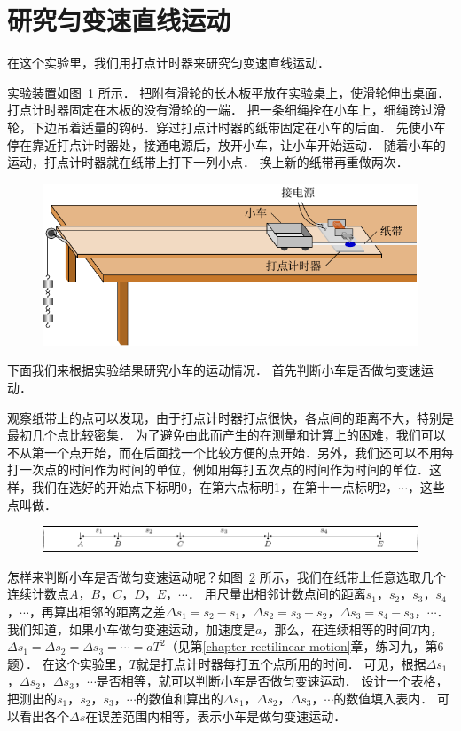 \section{研究匀变速直线运动}\label{sec-A-app-1-7-study of-uniformly-variable-linear-motion}
在这个实验里，我们用打点计时器来研究匀变速直线运动．

实验装置如图~\ref{fig_A_10-9} 所示．
把附有滑轮的长木板平放在实验桌上，使滑轮伸出桌面．打点计时器固定在木板的没有滑轮的一端．
把一条细绳拴在小车上，细绳跨过滑轮，下边吊着适量的钩码．穿过打点计时器的纸带固定在小车的后面．
先使小车停在靠近打点计时器处，接通电源后，放开小车，让小车开始运动．
随着小车的运动，打点计时器就在纸带上打下一列小点．
换上新的纸带再重做两次．	
\begin{figure}[htbp]
    \centering
    \includegraphics{fig/A/10-9.pdf}
    \caption{}\label{fig_A_10-9}
\end{figure}

下面我们来根据实验结果研究小车的运动情况．
首先判断小车是否做匀变速运动．

观察纸带上的点可以发现，由于打点计时器打点很快，各点间的距离不大，特别是最初几个点比较密集．
为了避免由此而产生的在测量和计算上的困难，我们可以不从第一个点开始，而在后面找一个比较方便的点开始．另外，我们还可以不用每打一次点的时间作为时间的单位，例如用每打五次点的时间作为时间的单位．这样，我们在选好的开始点下标明0，在第六点标明1，在第十一点标明2，$\cdots$，这些点叫做．

\begin{figure}[htbp]
    \centering
    \includegraphics{fig/A/10-10.pdf}
    \caption{}\label{fig_A_10-10}
\end{figure}
    

怎样来判断小车是否做匀变速运动呢？如图~\ref{fig_A_10-10} 所示，我们在纸带上任意选取几个连续计数点$A $，$ B $，$ C $，$ D $，$ E $，$ \cdots$．
用尺量出相邻计数点间的距离$s_1 $，$ s_2 $，$ s_3 $，$ s_4 $，$ \cdots$，再算出相邻的距离之差$\Delta s_1=s_2-s_1 $，$ \Delta s_2=s_3-s_2 $，$ \Delta s_3=s_4-s_3 $，$ \cdots$．
我们知道，如果小车做匀变速运动，加速度是$a$，那么，在连续相等的时间$T$内，$\Delta s_1=\Delta s_2=\Delta s_3=\cdots=aT^2$（见第\ref{chapter-rectilinear-motion}章，练习九，第6题）．
在这个实验里，$T$就是打点计时器每打五个点所用的时间．
可见，根据$\Delta s_1 $，$ \Delta s_2 $，$ \Delta s_3 $，$ \cdots$是否相等，就可以判断小车是否做匀变速运动．
设计一个表格，把测出的$s_1 $，$ s_2 $，$ s_3 $，$ \cdots$的数值和算出的$\Delta s_1 $，$ \Delta s_2 $，$ \Delta s_3 $，$ \cdots$的数值填入表内．
可以看出各个$\Delta s$在误差范围内相等，表示小车是做匀变速运动．

